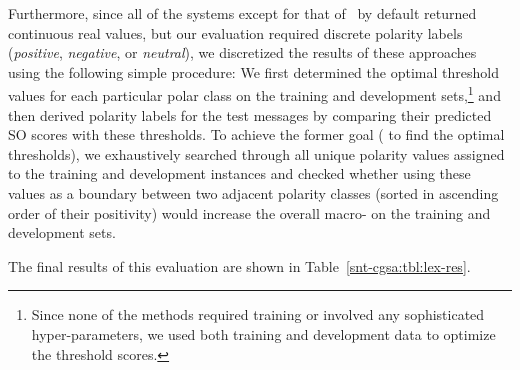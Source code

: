 Furthermore, since all of the systems except for that
of~\citet{Kolchyna:15} by default returned continuous real values, but
our evaluation required discrete polarity labels (\emph{positive},
\emph{negative}, or \emph{neutral}), we discretized the results of
these approaches using the following simple procedure: We first
determined the optimal threshold values for each particular polar
class on the training and development sets,\footnote{Since none of the
  methods required training or involved any sophisticated
  hyper-parameters, we used both training and development data to
  optimize the threshold scores.} and then derived polarity labels for
the test messages by comparing their predicted SO scores with these
thresholds.  To achieve the former goal (\ie{} to find the optimal
thresholds), we exhaustively searched through all unique polarity
values assigned to the training and development instances and checked
whether using these values as a boundary between two adjacent polarity
classes (sorted in ascending order of their positivity) would increase
the overall macro-\F{} on the training and development sets.

The final results of this evaluation are shown in
Table~\ref{snt-cgsa:tbl:lex-res}.

